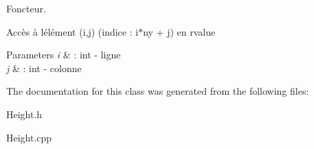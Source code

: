 Foncteur. 

Accès à l\textquotesingle{}élément (i,j) (indice \+: i$\ast$ny + j) en rvalue


\begin{DoxyParams}{Parameters}
{\em i} & \+: int -\/ ligne\\
\hline
{\em j} & \+: int -\/ colonne \\
\hline
\end{DoxyParams}


The documentation for this class was generated from the following files\+:\begin{DoxyCompactItemize}
\item 
Height.\+h\item 
Height.\+cpp\end{DoxyCompactItemize}
